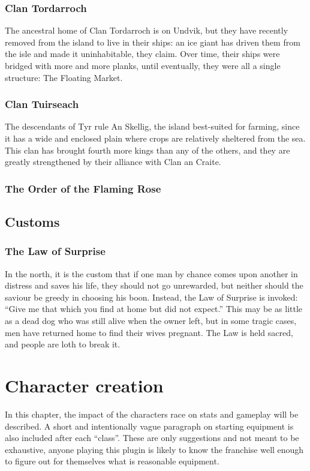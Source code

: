 \documentclass[parskip=full,11pt,%
footheight=38pt]{scrreport}
\begin{document}
\subsection{Clan Tordarroch}
The ancestral home of Clan Tordarroch is on Undvik, but they have recently removed from the island to live in their ships: an ice giant has driven them from
the isle and made it uninhabitable, they claim. Over time, their ships were bridged with more and more planks, until eventually, they were all a single structure:
The Floating Market.

\subsection{Clan Tuirseach}
The descendants of Tyr rule An Skellig, the island best-suited for farming, since it has a wide and enclosed plain where crops are relatively sheltered from the
sea. This clan has brought fourth more kings than any of the others, and they are greatly strengthened by their alliance with Clan an Craite.

\subsection{The Order of the Flaming Rose}

\section{Customs}

\subsection{The Law of Surprise}
In the north, it is the custom that if one man by chance comes upon another in distress and saves his life, they should not go unrewarded, but neither
should the saviour be greedy in choosing his boon. Instead, the Law of Surprise is invoked: ``Give me that which you find at home but did not expect.''
This may be as little as a dead dog who was still alive when the owner left, but in some tragic cases, men have returned home to find their wives pregnant.
The Law is held sacred, and people are loth to break it.

\chapter{Character creation}
In this chapter, the impact of the characters race on stats and gameplay will be described. A short and intentionally vague paragraph on starting
equipment is also included after each ``class''. These are only suggestions and not meant to be exhaustive, anyone playing this plugin is likely
to know the franchise well enough to figure out for themselves what is reasonable equipment.
\end{document}
